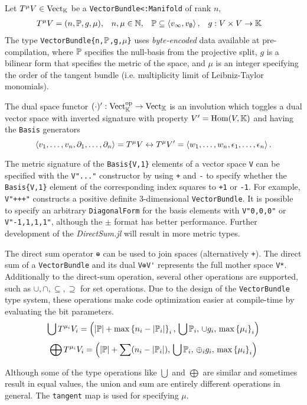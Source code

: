 \documentclass{juliacon}
\begin{document}
\begin{definition}
	Let $T^\mu V\in\text{Vect}_{\mathbb{K}}$ be a \verb`VectorBundle<:Manifold` of rank $n$,
	\begin{align*}
		T^\mu V &= (n,\mathbb{P},g,\mu), & n,\mu &\in\mathbb{N}, & \mathbb{P} &\subseteq\left\langle v_\infty,v_\emptyset \right\rangle, & g &:V\times V\rightarrow\mathbb{K}
	\end{align*}
	The type \verb+VectorBundle{n,+$\mathbb{P}$\verb+,g,+$\mu$\verb+}+ uses \textit{byte-encoded} data available at pre-compilation, where
	$\mathbb{P}$ specifies the null-basis from the projective split,
	$g$ is a bilinear form that specifies the metric of the space,
	and $\mu$ is an integer specifying the order of the tangent bundle (i.e. multiplicity limit of Leibniz-Taylor monomials).

	The dual space functor $(\cdot)':\text{Vect}_{\mathbb{K}}^\text{op}\rightarrow\text{Vect}_{\mathbb{K}}$ 
	is an involution which toggles a dual vector space with inverted signature with property $V' = \text{Hom}(V,\mathbb{K})$ and having the \verb`Basis` generators
	$$\left\langle v_1,\dots,v_n,\partial_1,\dots,\partial_n \right\rangle=T^\mu V\leftrightarrow T^\mu V' = \left\langle w_1,\dots,w_n,\epsilon_1,\dots,\epsilon_n \right\rangle.$$

	The metric signature of the \verb+Basis{V,1}+ elements of a vector space \verb+V+ can be specified with the \verb+V"..."+ constructor by using \verb-+- and \verb+-+ to specify whether the \verb+Basis{V,1}+ element of the corresponding index squares to \verb`+1` or \verb`-1`.
	For example, \verb`V"+++"` constructs a positive definite 3-dimensional \verb`VectorBundle`.
	It is possible to specify an arbitrary \verb`DiagonalForm` for the basis elements with \verb`V"0,0,0"` or \verb`V"-1,1,1,1"`, although the $\pm$ format has better performance.
	Further development of the \textit{DirectSum.jl} will result in more metric types.

	The direct sum operator \verb`⊕` can be used to join spaces (alternatively \verb`+`).
	The direct sum of a \verb`VectorBundle` and its dual \verb`V⊕V'` represents the full mother space \verb`V*`.
	Additionally to the direct-sum operation, several other operations are supported, such as $\cup,\cap,\subseteq,\supseteq$ for set operations.
	Due to the design of the \verb`VectorBundle` type system, these operations make code optimization easier at compile-time by evaluating the bit parameters.
	$$ \bigcup T^{\mu_i}V_i = \left(|\mathbb{P}|+\max\left\{ n_i-|\mathbb{P}_i| \right\}_i,\, \bigcup \mathbb{P}_i,\, \cup g_i,\, \max\left\{ \mu_i \right\}_i\right) $$
	$$ \bigoplus T^{\mu_i}V_i = \left(\left|\mathbb{P}\right|+\sum (n_i-|\mathbb{P}_i|),\, \bigcup \mathbb{P}_i,\, \oplus_i g_i,\,\max\left\{ \mu_i \right\}_i\right) $$
\end{definition}
\begin{remark}
	Although some of the type operations like $\bigcup$ and $\bigoplus$ are similar and sometimes result in equal values, the union and sum are entirely different operations in general. The \verb`tangent` map is used for specifying $\mu$.
\end{remark}
\end{document}
